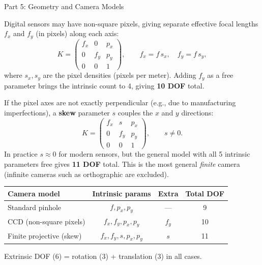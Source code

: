\documentclass[letterpaper]{article}
\begin{document}
\begin{notes}{Part 5: Geometry and Camera Models}

Digital sensors may have non-square pixels, giving separate effective focal
lengths $f_x$ and $f_y$ (in pixels) along each axis:
\begin{equation}
  K = \begin{pmatrix}
    f_x & 0   & p_x \\
    0   & f_y & p_y \\
    0   & 0   & 1
  \end{pmatrix}, \qquad f_x = f\,s_x,\quad f_y = f\,s_y,
\end{equation}
where $s_x, s_y$ are the pixel densities (pixels per meter).  Adding
$f_y$ as a free parameter brings the intrinsic count to 4, giving
\textbf{10 DOF} total.


If the pixel axes are not exactly perpendicular (e.g., due to
manufacturing imperfections), a \textbf{skew} parameter $s$ couples the
$x$ and $y$ directions:
\begin{equation}
  K = \begin{pmatrix}
    f_x & s   & p_x \\
    0   & f_y & p_y \\
    0   & 0   & 1
  \end{pmatrix}, \qquad s \neq 0.
\end{equation}
In practice $s \approx 0$ for modern sensors, but the general model with
all 5 intrinsic parameters free gives \textbf{11 DOF} total.  This is the
most general \emph{finite} camera (infinite cameras such as orthographic
are excluded).


\begin{center}
\begin{tabular}{lccc}
  \toprule
  Camera model & Intrinsic params & Extra & Total DOF \\
  \midrule
  Standard pinhole        & $f, p_x, p_y$         & ---       & 9  \\
  CCD (non-square pixels) & $f_x, f_y, p_x, p_y$  & $f_y$     & 10 \\
  Finite projective (skew)& $f_x, f_y, s, p_x, p_y$ & $s$    & 11 \\
  \bottomrule
\end{tabular}
\end{center}

\noindent Extrinsic DOF (6) = rotation (3) + translation (3) in all cases.


\end{notes}
\end{document}
